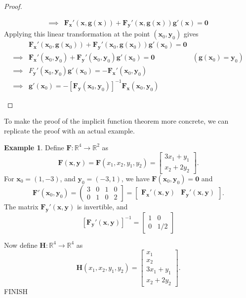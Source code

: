 \documentclass{article}
\newcommand{\R}{\mathbb{R}}
\newcommand{\x}{\mathbf{x}}
\newcommand{\F}{\mathbf{F}}
\newcommand{\y}{\mathbf{y}}
\newcommand{\g}{\mathbf{g}}
\newcommand{\ze}{\mathbf{0}}
\theoremstyle{definition}
\newtheorem{example}{Example}[section]
\begin{document}
\begin{proof}
\begin{enumerate}
\begin{enumerate}
\begin{align*}
					\implies & \F_\x'(\x,\g(\x)) + \F_\y'(\x,\g(\x))\g'(\x) = \ze 
				\end{align*}
				Applying this linear transformation  at the point $ (\x_0,\y_0) $ gives 
				\begin{align*}
					&\F_\x'(\x_0,\g(\x_0)) + \F_\y'(\x_0,\g(\x_0))\g'(\x_0) = \ze \\
					\implies & \F_\x'(\x_0,\y_0) + \F_\y'(\x_0,\y_0)\g'(\x_0) = \ze & (\g(\x_0) = \y_0) \\ 
					\implies & F_\y'(\x_0,\y_0)\g'(\x_0) = -\F_\x'(\x_0,\y_0)  \\
					\implies & \g'(\x_0)=-[\mathbf F_\y(\x_0,\y_0)]^{-1}\mathbf F_\x(\x_0,\y_0)
				\end{align*}
			\end{enumerate}
		\end{enumerate}
	\end{proof}
	To make the proof of the implicit function theorem more concrete, we can replicate the proof with an actual example.
	\begin{example}
		Define $ \F:\R^4\to\R^2 $ as 
		$$ \F(\x,\y) = \F(x_1,x_2,y_1,y_2) = \begin{bmatrix}
			3x_1 + y_1\\
			x_2 + 2y_2
		\end{bmatrix}.$$
		For $ \x_0 = (1,-3) $, and $ \y_0 = (-3,1) $, we have $ \F(\x_0,\y_0)=\ze $ and 
		$$ \F'(\x_0,\y_0) =\left(
		\begin{array}{cc|cc}
			3&0&1&0\\
			0&1&0&2
		\end{array}\right] = \begin{bmatrix}
			\mathbf F_\x'(\x,\y) & \mathbf F_\y'(\x,\y) 
		\end{bmatrix}.$$
		The matrix  $\mathbf F_\y'(\x,\y) $ is invertible, and 
		$$[\mathbf F_\y'(\x,\y)]^{-1}  = \begin{bmatrix}
			1 & 0\\0 &1/2
		\end{bmatrix}$$
		
		Now define $ \mathbf H:\R^4\to\R^4 $ as 
		$$ \mathbf H(x_1,x_2,y_1,y_2) = \begin{bmatrix}
			x_1\\
			x_2\\
			3x_1 + y_1\\
			x_2 + 2y_2
		\end{bmatrix}.$$
	{\color{red}FINISH}
	\end{example}
\end{document}
